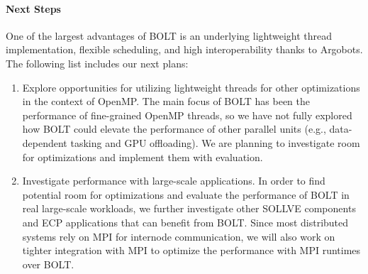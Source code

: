 \paragraph{Next Steps}

One of the largest advantages of BOLT is an underlying lightweight
thread implementation, flexible scheduling, and high interoperability
thanks to Argobots. The following list includes our next plans:

\begin{enumerate}

\item Explore opportunities for utilizing lightweight threads for
other optimizations in the context of OpenMP.  The main focus of BOLT
has been the performance of fine-grained OpenMP threads, so we have
not fully explored how BOLT could elevate the performance of other
parallel units (e.g., data-dependent tasking and GPU offloading). We
are planning to investigate room for optimizations and implement them
with evaluation.

\item Investigate performance with large-scale applications.
In order to find potential room for optimizations and evaluate the
performance of BOLT in real large-scale workloads, we further
investigate other SOLLVE components and ECP applications that can benefit from BOLT.  Since most distributed systems rely on MPI for internode
communication, we will also work on tighter integration with MPI to
optimize the performance with MPI runtimes over BOLT.

\end{enumerate}
